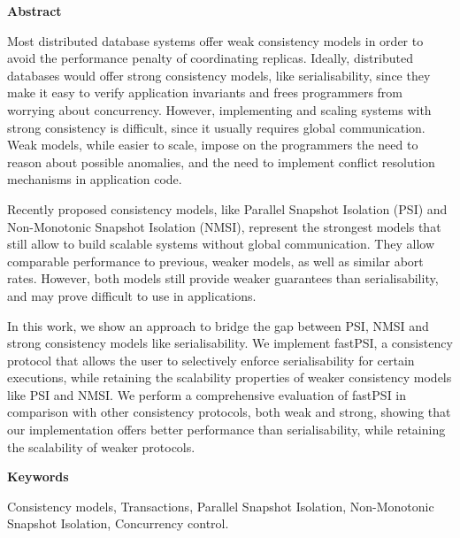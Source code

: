 \newpage

\begin{center}
{\bf \Huge Abstract}
\end{center}

\vspace{1cm}

Most distributed database systems offer weak consistency models in order to avoid
the performance penalty of coordinating replicas. Ideally, distributed databases
would offer strong consistency models, like serialisability, since they make it
easy to verify application invariants and frees programmers from worrying about
concurrency. However, implementing and scaling systems with strong consistency
is difficult, since it usually requires global communication. Weak models, while
easier to scale, impose on the programmers the need to reason about possible
anomalies, and the need to implement conflict resolution mechanisms in application
code.

Recently proposed consistency models, like Parallel Snapshot Isolation (PSI) and
Non-Monotonic Snapshot Isolation (NMSI), represent the strongest models that still
allow to build scalable systems without global communication. They allow comparable
performance to previous, weaker models, as well as similar abort rates. However, both
models still provide weaker guarantees than serialisability, and may prove difficult
to use in applications.

In this work, we show an approach to bridge the gap between PSI, NMSI and strong
consistency models like serialisability. We implement fastPSI, a consistency protocol
that allows the user to selectively enforce serialisability for certain executions,
while retaining the scalability properties of weaker consistency models like PSI and
NMSI. We perform a comprehensive evaluation of fastPSI in comparison with other
consistency protocols, both weak and strong, showing that our implementation
offers better performance than serialisability, while retaining the scalability
of weaker protocols.

\vspace{1cm}

\begin{center}
{\bf \Large Keywords}
\end{center}

\vspace{0.5cm}

Consistency models, Transactions, Parallel Snapshot Isolation, Non-Monotonic
Snapshot Isolation, Concurrency control.
